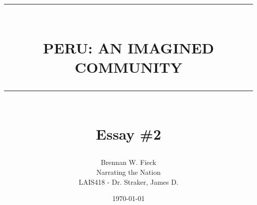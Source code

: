 \documentclass[12pt]{report}
\newcommand{\HRule}[1]{\rule{\linewidth}{#1}}
\begin{document}
\title{
		~\\ [2.0cm]
		\HRule{0.5pt} \\
		\LARGE \textbf{\uppercase{Peru: An Imagined Community}}
		\HRule{2pt} \\ [0.5cm]
		\normalsize Essay \#2 \vspace*{5\baselineskip}}

\date{\today}

\author{
		Brennan W. Fieck \\ 
		Narrating the Nation \\
		LAIS418 - Dr. Straker, James D. }

\maketitle
\newpage
\end{document}
